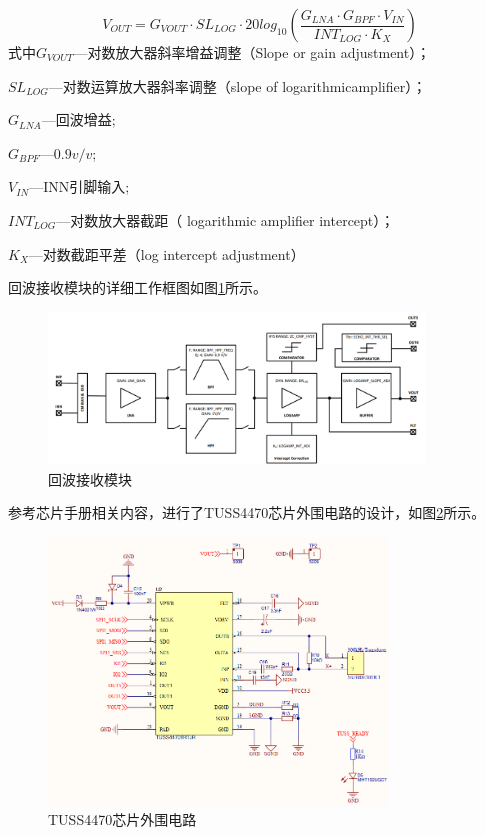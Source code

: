     \begin{equation}
        V_{OUT}=G_{VOUT} \cdot SL_{LOG}\cdot20log_{10}(\frac{G_{LNA} \cdot G_{BPF} \cdot V_{IN}}{INT_{LOG} \cdot K_X})
        \label{VOUT公式}
    \end{equation}
式中\quad $G_{VOUT}$---对数放大器斜率增益调整（Slope or gain adjustment）；\par
\quad$SL_{LOG}$---对数运算放大器斜率调整（slope of logarithmicamplifier）；\par
\quad$G_{LNA}$---回波增益;\par
\quad$G_{BPF}$---$0.9v/v$;\par
\quad$V_{IN}$---INN引脚输入;\par
\quad$INT_{LOG}$---对数放大器截距（ logarithmic amplifier intercept）；\par
\quad$K_X$---对数截距平差（log intercept adjustment）\par
    回波接收模块的详细工作框图如图\ref{回波接收模块}所示。
    \begin{figure}[ht]
        \centering
        \includegraphics[width=10cm]{figure/Analog Front-End Block Diagram.png}
        \caption{回波接收模块}
        \label{回波接收模块}
    \end{figure}\par

    参考芯片手册相关内容，进行了TUSS4470芯片外围电路的设计，如图\ref{TUSS4470芯片外围电路}所示。
    \begin{figure}[!h]
        \centering
        \includegraphics[width=9cm]{figure/TUSS4470 peripheral circuit.png}
        \caption{TUSS4470芯片外围电路}
        \label{TUSS4470芯片外围电路}
    \end{figure}
\newpage
